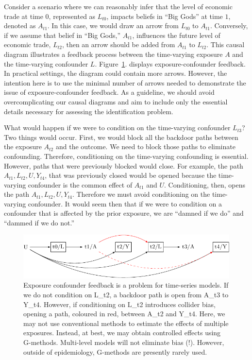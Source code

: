 \documentclass[
  singlecolumn,
  9pt]{article}
\begin{document}
Consider a scenario where we can reasonably infer that the level of
economic trade at time \(0\), represented as \(L_{t0}\), impacts beliefs
in ``Big Gods'' at time \(1\), denoted as \(A_{t1}\). In this case, we
would draw an arrow from \(L_{t0}\) to \(A_{t1}\). Conversely, if we
assume that belief in ``Big Gods,'' \(A_{t1}\), influences the future
level of economic trade, \(L_{t2}\), then an arrow should be added from
\(A_{t1}\) to \(L_{t2}\). This causal diagram illustrates a feedback
process between the time-varying exposure \(A\) and the time-varying
confounder \(L\). Figure~\ref{fig-dag-9}. displays exposure-confounder
feedback. In practical settings, the diagram could contain more arrows.
However, the intention here is to use the minimal number of arrows
needed to demonstrate the issue of exposure-confounder feedback. As a
guideline, we should avoid overcomplicating our causal diagrams and aim
to include only the essential details necessary for assessing the
identification problem.

What would happen if we were to condition on the time-varying confounder
\(L_{t3}\)? Two things would occur. First, we would block all the
backdoor paths between the exposure \(A_{t2}\) and the outcome. We need
to block those paths to eliminate confounding. Therefore, conditioning
on the time-varying confounding is essential. However, paths that were
previously blocked would close. For example, the path
\(A_{t1}, L_{t2}, U, Y_{t4}\), that was previously closed would be
opened because the time-varying confounder is the common effect of
\(A_{t1}\) and \(U\). Conditioning, then, opens the path
\(A_{t1}, L_{t2}, U, Y_{t4}\). Therefore we must avoid conditioning on
the time-varying confounder. It would seem then that if we were to
condition on a confounder that is affected by the prior exposure, we are
``damned if we do'' and ``dammed if we do not.''

\begin{figure}

{\centering \includegraphics[width=1\textwidth,height=\textheight]{causal-dags_files/figure-pdf/fig-dag-9-1.pdf}

}

\caption{\label{fig-dag-9}Exposure confounder feedback is a problem for
time-series models. If we do not condition on L\_t2, a backdoor path is
open from A\_t3 to Y\_t4. However, if conditioning on L\_t2 introduces
collider bias, opening a path, coloured in red, between A\_t2 and Y\_t4.
Here, we may not use conventional methods to estimate the effects of
multiple exposures. Instead, at best, we may obtain controlled effects
using G-methods. Multi-level models will not eliminate bias (!).
However, outside of epidemiology, G-methods are presently rarely used.}

\end{figure}
\end{document}
